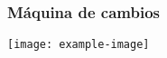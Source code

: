 \subsubsection{Máquina de cambios}

\lipsum[1]

\lipsum[1]
\texttt{[image: example-image]}
\lipsum[1]